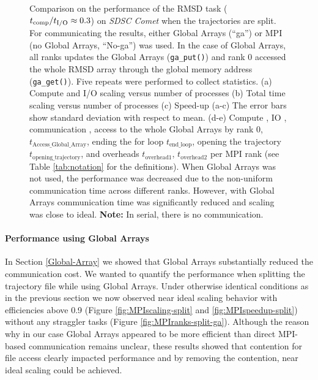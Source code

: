 \begin{figure}[ht!]
\caption{Comparison on the performance of the RMSD task (${t}_{\text{comp}}/{t}_{\text{I/O}} \approx 0.3$) on \emph{SDSC Comet} when the trajectories are split. For communicating the results, either Global Arrays (``ga'') or MPI (no Global Arrays, ``No-ga'') was used.  In the case of Global Arrays, all ranks updates the Global Arrays (\texttt{ga\_put()}) and rank 0 accessed the whole RMSD array through the global memory address (\texttt{ga\_get()}).  Five repeats were performed to collect statistics. (a) Compute and I/O scaling versus number of processes (b) Total time scaling versus number of processes (c) Speed-up (a-c) The error bars show standard deviation with respect to mean. (d-e) Compute \tcomp, IO \tIO, communication \tcomm, access to the whole Global Arrays by rank 0, $t_{\text{Access\_Global\_Array}}$, ending the for loop $t_{\text{end\_loop}}$, opening the trajectory $t_{\text{opening\_trajectory}}$, and overheads $t_{\text{overhead1}}$, $t_{\text{overhead2}}$ per MPI rank (see Table \ref{tab:notation} for the definitions). When Global Arrays was not used, the performance was decreased due to the non-uniform communication time across different ranks. However, with Global Arrays communication time was significantly reduced and scaling was close to ideal. \textbf{Note:} In serial, there is no communication.}
\label{fig:MPIwithIO-split}
\end{figure}

\paragraph{Performance using Global Arrays}
In Section \ref{Global-Array} we showed that Global Arrays substantially reduced the communication cost. 
We wanted to quantify the performance when splitting the trajectory file while using Global Arrays.
Under otherwise identical conditions as in the previous section we now observed near ideal scaling behavior with efficiencies above 0.9 (Figure \ref{fig:MPIscaling-split} and \ref{fig:MPIspeedup-split}) without any straggler tasks (Figure \ref{fig:MPIranks-split-ga}).  
Although the reason why in our case Global Arrays appeared to be more efficient than direct MPI-based communication remains unclear, these results showed that contention for file access clearly impacted performance and by removing the contention, near ideal scaling could be achieved.

